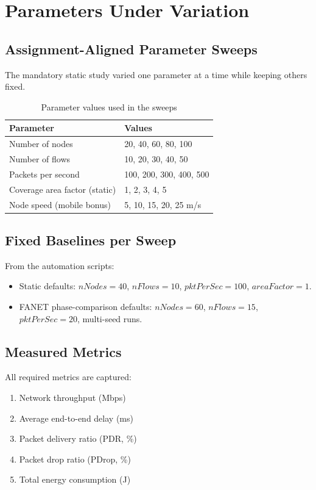 \documentclass[12pt,a4paper]{article}
\begin{document}
\section{Parameters Under Variation}

\subsection{Assignment-Aligned Parameter Sweeps}
The mandatory static study varied one parameter at a time while keeping others fixed.

\begin{table}[H]
\centering
\caption{Parameter values used in the sweeps}
\begin{tabular}{ll}
\toprule
\textbf{Parameter} & \textbf{Values} \\
\midrule
Number of nodes & 20, 40, 60, 80, 100 \\
Number of flows & 10, 20, 30, 40, 50 \\
Packets per second & 100, 200, 300, 400, 500 \\
Coverage area factor (static) & 1, 2, 3, 4, 5 \\
Node speed (mobile bonus) & 5, 10, 15, 20, 25 m/s \\
\bottomrule
\end{tabular}
\end{table}

\subsection{Fixed Baselines per Sweep}
From the automation scripts:
\begin{itemize}[leftmargin=1.5em]
    \item Static defaults: $nNodes=40$, $nFlows=10$, $pktPerSec=100$, $areaFactor=1$.
    \item FANET phase-comparison defaults: $nNodes=60$, $nFlows=15$, $pktPerSec=20$, multi-seed runs.
\end{itemize}

\subsection{Measured Metrics}
All required metrics are captured:
\begin{enumerate}[leftmargin=1.5em]
    \item Network throughput (Mbps)
    \item Average end-to-end delay (ms)
    \item Packet delivery ratio (PDR, \%)
    \item Packet drop ratio (PDrop, \%)
    \item Total energy consumption (J)
\end{enumerate}
\end{document}
